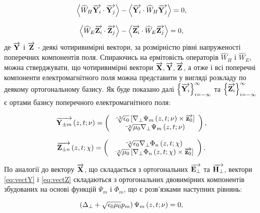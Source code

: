 \begin{equation}
\left< \widehat{W}_H \overrightarrow{\mathbf Y_i} \cdot \overrightarrow{\mathbf Y_j} \right> -
\left< \overrightarrow{\mathbf Y_i} \cdot \widehat{W}_H \overrightarrow{\mathbf Y_j} \right> = 0,
\end{equation}

\begin{equation}
\left< \widehat{W}_E \overrightarrow{\mathbf Z_i} \cdot \overrightarrow{\mathbf Z_j} \right> -
\left< \overrightarrow{\mathbf Z_i} \cdot \widehat{W}_E \overrightarrow{\mathbf Z_j} \right> = 0,
\end{equation}
%
де $ \overrightarrow{\mathbf Y} $ і $ \overrightarrow{\mathbf Z} $ - деякі чотиривимірні вектори, за розмірністю 
рівні напруженості поперечних компонентів поля. Спираючись на ермітовість 
операторів $ \widehat{W}_H $ і $ \widehat{W}_E $, можна стверджувати, що 
чотиривимірні вектори $ \overrightarrow{\mathbf X}, \overrightarrow{\mathbf Y}, \overrightarrow{\mathbf Z} $, а отже і всі поперечні 
компоненти електромагнітного поля можна представити у вигляді розкладу по 
деякому ортогональному базису. Як буде показано далі
$ \left\{ \overrightarrow{\mathbf Y_i} \right\}_{i=-\infty}^\infty $ та 
$ \left\{ \overrightarrow{\mathbf Z_i} \right\}_{i=-\infty}^\infty $ є ортами базису 
поперечного електромагнітного поля:

\begin{equation} \label{eq:vectY}
\overrightarrow{\mathbf Y_{\pm m}} \left( z,t;\nu \right) =
\left( \begin{array}{c} 
\sqrt[-2]{\epsilon_0} 
\left[ \nabla_\perp \Psi_m \left( z,t;\nu \right) \times \overrightarrow{\mathbf z_0} \right] \\ 
\sqrt[-2]{\mu_0} \nabla_\perp \Psi_m \left( z,t;\nu \right) \\ 
\end{array} \right),
\end{equation}

\begin{equation} \label{eq:vectZ}
\overrightarrow{\mathbf Z_{\pm n}} \left( z,t;\chi \right) =
\left( \begin{array}{c} 
\sqrt[-2]{\epsilon_0} \nabla_\perp \Phi_n \left( z,t;\chi \right) \\ 
\sqrt[-2]{\mu_0} \left[ \nabla_\perp \Phi_n \left( z,t;\chi \right) \times \overrightarrow{\mathbf z_0} \right] \\ 
\end{array} \right).
\end{equation}

По аналогії до вектору $ \overrightarrow{\mathbf X} $, що складається з ортогональних 
$ \overrightarrow{\mathbf E_\perp} $ та $ \overrightarrow{\mathbf H_\perp} $, вектори \eqref{eq:vectY} і 
\eqref{eq:vectZ} складаються з ортогональних двовимірних компонентів 
збудованих на основі функцій $ \Psi_m $ і $ \Phi_m $, що є розв'язками
наступних рівнянь:

\begin{equation} \label{eq:equation_psi}
\left( \Delta_\perp + \sqrt{\epsilon_0 \mu_0} p_m \right) 
\Psi_m \left( z,t;\nu \right) = 0,
\end{equation}

